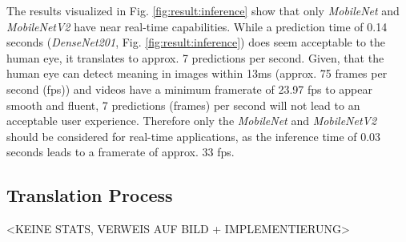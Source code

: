 The results visualized in Fig. \ref{fig:result:inference} show that only \textit{MobileNet} and \textit{MobileNetV2} have near real-time capabilities. While a prediction time of 0.14 seconds (\textit{DenseNet201}, Fig. \ref{fig:result:inference}) does seem acceptable to the human eye, it translates to approx. 7 predictions per second. Given, that the human eye can detect meaning in images within 13ms\cite{Potter2014} (approx. 75 frames per second (fps)) and videos have a minimum framerate of 23.97 fps to appear smooth and fluent, 7 predictions (frames) per second will not lead to an acceptable user experience. Therefore only the \textit{MobileNet} and \textit{MobileNetV2} should be considered for real-time applications, as the inference time of 0.03 seconds leads to a framerate of approx. 33 fps.

\subsection{Translation Process}
<KEINE STATS, VERWEIS AUF BILD + IMPLEMENTIERUNG>
